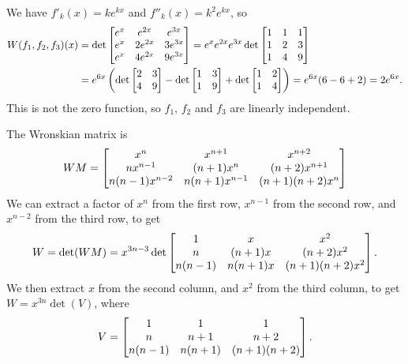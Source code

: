  We have $f'_k(x)=ke^{kx}$ and $f''_k(x)=k^2e^{kx}$, so
 \begin{align*}
  W(f_1,f_2,f_3)(x)
   &= \det\left[\begin{matrix} e^x &   e^{2x} &   e^{3x} \\
               e^x & 2 e^{2x} & 3 e^{3x} \\
               e^x & 4 e^{2x} & 9 e^{3x} \end{matrix}\right]
    = e^x e^{2x} e^{3x} \det \left[\begin{matrix} 1&1&1 \\ 1&2&3 \\ 1&4&9 \end{matrix}\right] \\
   &= e^{6x}\left(
         \det\left[\begin{matrix} 2&3\\4&9 \end{matrix}\right]
       - \det\left[\begin{matrix} 1&3\\1&9 \end{matrix}\right]
       + \det\left[\begin{matrix} 1&2\\1&4 \end{matrix}\right]
      \right)
    = e^{6x} (6 - 6 + 2) = 2 e^{6x}.
 \end{align*}
 This is not the zero function, so $f_1$, $f_2$ and $f_3$
 are linearly independent.
\EndDeferredSolution

 The Wronskian matrix is
 \[ WM = \left[\begin{matrix}
     x^n           & x^{n+1}       & x^{n+2}           \\
     n x^{n-1}     & (n+1) x^n     & (n+2) x^{n+1}     \\
     n(n-1)x^{n-2} & n(n+1)x^{n-1} & (n+1)(n+2) x^n
    \end{matrix}\right]
 \]
 We can extract a factor of $x^n$ from the first row, $x^{n-1}$ from
 the second row, and $x^{n-2}$ from the third row, to get
 \[ W = \det(WM) = x^{3n-3} \det\left[\begin{matrix}
     1      & x       & x^2           \\
     n      & (n+1) x & (n+2) x^2     \\
     n(n-1) & n(n+1)x & (n+1)(n+2) x^2
    \end{matrix}\right] .
 \]
 We then extract $x$ from the second column, and $x^2$ from the third
 column, to get $W=x^{3n}\det(V)$, where
 \[ V = \left[\begin{matrix}
     1      & 1      & 1        \\
     n      & n+1    & n+2      \\
     n(n-1) & n(n+1) & (n+1)(n+2)
    \end{matrix}\right] .
 \]

